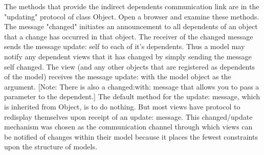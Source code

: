 \documentclass[a4paper, 11pt]{book}
\begin{document}
The methods that provide the indirect dependents communication link are in the
"updating" protocol of class Object. Open a browser and examine these methods.
The message "changed" initiates an announcement to all dependents of an object
that a change has occurred in that object. The receiver of the changed message
sends the message update: self to each of it's dependents. Thus a model may
notify any dependent views that it has changed by simply sending the message
self changed. The view (and any other objects that are registered as dependents
of the model) receives the message update: with the model object as the
argument. [Note: There is also a changed:with: message that allows you to pass a
parameter to the dependent.] The default method for the update: message, which
is inherited from Object, is to do nothing. But most views have protocol to
redisplay themselves upon receipt of an update: message. This changed/update
mechanism was chosen as the communication channel through which views can be
notified of changes within their model because it places the fewest constraints
upon the structure of models.
\end{document}

